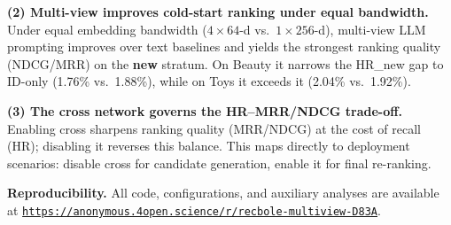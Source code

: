 \documentclass[sigconf,natbib=true,anonymous]{acmart}
\newcommand{\llm}{\textsc{LLM}\xspace}
\begin{document}
\textbf{(2) Multi-view improves cold-start ranking under equal bandwidth.}
Under equal embedding bandwidth ($4{\times}64$-d vs.\ $1{\times}256$-d),
multi-view \llm prompting improves over text baselines and yields the
strongest ranking quality (NDCG/MRR) on the \textbf{new} stratum.
On Beauty it narrows the HR\_new gap to ID-only
(1.76\% vs.\ 1.88\%), while on Toys it exceeds it
(2.04\% vs.\ 1.92\%).

\textbf{(3) The cross network governs the HR--MRR/NDCG trade-off.}
Enabling cross sharpens ranking quality (MRR/NDCG) at the cost of
recall (HR); disabling it reverses this balance. This maps directly
to deployment scenarios: disable cross for candidate generation,
enable it for final re-ranking.

\smallskip\noindent
\textbf{Reproducibility.} All code, configurations, and auxiliary
analyses are available at
\texttt{\url{https://anonymous.4open.science/r/recbole-multiview-D83A}}.




\end{document}
